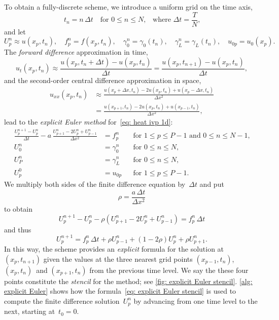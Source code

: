 To obtain a fully-discrete scheme, we introduce a uniform grid on the time axis,
\[
t_n=n\,\Delta t\quad\text{for $0\le n\le N$,}
	\quad\text{where $\Delta t=\frac{T}{N}$,}
\]
and let
\[
U^n_p\approx u(x_p,t_n),\quad
f^n_p=f(x_p,t_n),\quad
\gamma_0^n=\gamma_0(t_n),\quad
\gamma_L^n=\gamma_L(t_n),\quad
u_{0p}=u_0(x_p).
\]
The \emph{forward difference} approximation in time,
\[
u_t(x_p,t_n)\approx\frac{u(x_p,t_n+\Delta t)-u(x_p,t_n)}{\Delta t}
	=\frac{u(x_p,t_{n+1})-u(x_p,t_n)}{\Delta t},
\]
and the second-order central difference approximation in space,
\begin{align*}
u_{xx}(x_p,t_n)
&\approx\frac{u(x_p+\Delta x,t_n)-2u(x_p,t_n)+u(x_p-\Delta x,t_n)}{\Delta x^2}\\
&=\frac{u(x_{p+1},t_n)-2u(x_p,t_n)+u(x_{p-1},t_n)}{\Delta x^2},
\end{align*}
lead to the \emph{explicit Euler method} for~\eqref{eq: heat ivp 1d}:
\begin{equation}\label{eq: explicit Euler 1d}
\begin{aligned}
\frac{U^{n+1}_p-U^n_p}{\Delta t}
	-a\,\frac{U^n_{p+1}-2U^n_p+U^n_{p-1}}{\Delta x^2}&=f^n_p&
&\text{for $1\le p\le P-1$ and $0\le n\le N-1$,}\\
U^n_0&=\gamma_0^n&&\text{for $0\le n\le N$,}\\
U^n_P&=\gamma_L^n&&\text{for $0\le n\le N$,}\\
U^0_p&=u_{0p}&&\text{for $1\le p\le P-1$.}
\end{aligned}
\end{equation}
We multiply both sides of the finite difference equation by~$\Delta t$ and put
\begin{equation}\label{eq: rho explicit Euler}
\rho=\frac{a\,\Delta t}{\Delta x^2}
\end{equation}
to obtain
\[
U^{n+1}_p-U^n_p-\rho(U^n_{p+1}-2U^n_p+U^n_{p-1})=f^n_p\,\Delta t
\]
and thus
\begin{equation}\label{eq: explicit Euler stencil}
U^{n+1}_p=f^n_p\,\Delta t+\rho U^n_{p-1}+(1-2\rho)U^n_p+\rho U^n_{p+1}.
\end{equation}
In this way, the scheme provides an \emph{explicit} formula for the solution 
at~$(x_p,t_{n+1})$ given the values at the three nearest grid 
points $(x_{p-1},t_n)$, $(x_p,t_n)$~and $(x_{p+1},t_n)$ from the previous time 
level.  We say the these four points constitute the \emph{stencil} for the 
method; see \cref{fig: explicit Euler stencil}.
\cref{alg: explicit Euler} shows how the 
formula~\eqref{eq: explicit Euler stencil} is used to compute the finite 
difference solution~$U^n_p$ by advancing from one time level to the next, 
starting at~$t_0=0$.  

